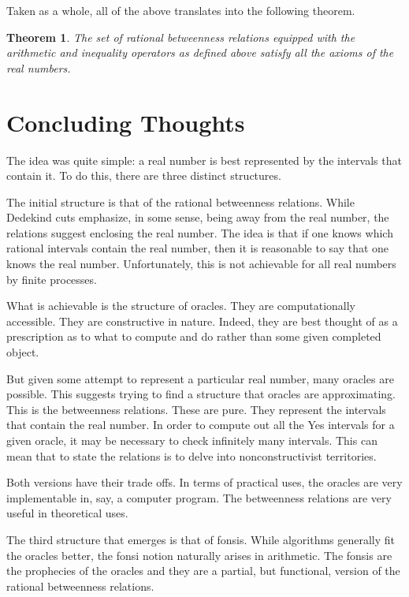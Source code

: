 \documentclass[12pt]{article}
\newtheorem{theorem}{Theorem}[section]
\begin{document}
Taken as a whole, all of the above translates into the following theorem.

\begin{theorem}
    The set of rational betweenness relations equipped with the arithmetic and inequality operators as defined above satisfy all the axioms of the real numbers. 
\end{theorem}


\section{Concluding Thoughts}

The idea was quite simple: a real number is best represented by the intervals that contain it. To do this, there are three distinct structures. 

The initial structure is that of the rational betweenness relations. While Dedekind cuts emphasize, in some sense, being away from the real number, the relations suggest enclosing the real number. The idea is that if one knows which rational intervals contain the real number, then it is reasonable to say that one knows the real number. Unfortunately, this is not achievable for all real numbers by finite processes. 

What is achievable is the structure of oracles. They are computationally accessible. They are constructive in nature. Indeed, they are best thought of as a prescription as to what to compute and do rather than some given completed object. 

But given some attempt to represent a particular real number, many oracles are possible. This suggests trying to find a structure that oracles are approximating. This is the betweenness relations. These are pure. They represent the intervals that contain the real number. In order to compute out all the Yes intervals for a given oracle, it may be necessary to check infinitely many intervals. This can mean that to state the relations is to delve into nonconstructivist territories. 

Both versions have their trade offs. In terms of practical uses, the oracles are very implementable in, say, a computer program. The betweenness relations are very useful in theoretical uses. 

The third structure that emerges is that of fonsis. While algorithms generally fit the oracles better, the fonsi notion naturally arises in arithmetic. The fonsis are the prophecies of the oracles and they are a partial, but functional, version of the rational betweenness relations. 
\end{document}
